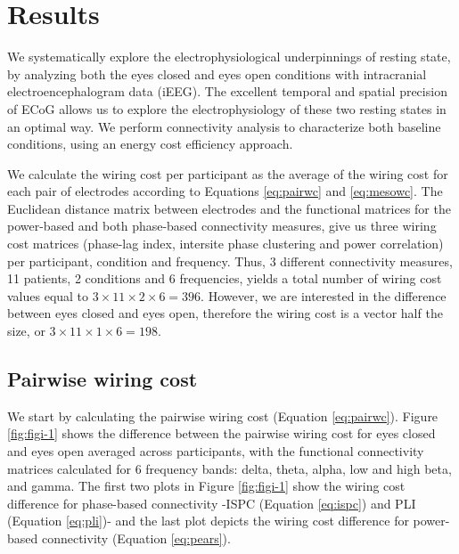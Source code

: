 \documentclass[11pt, onecolumn]{article}
\begin{document}
\section{Results}
We systematically explore the electrophysiological underpinnings of resting state, by analyzing both the eyes closed and eyes open conditions with intracranial electroencephalogram data (iEEG).
The excellent temporal and spatial precision of ECoG allows us to explore the electrophysiology of these two resting states in an optimal way. 
We perform connectivity analysis to characterize both baseline conditions, using an energy cost efficiency approach. 

We calculate the wiring cost per participant as the average of the wiring cost for each pair of electrodes according to Equations \ref{eq:pairwc} and \ref{eq:mesowc}. The Euclidean distance matrix between electrodes and the functional matrices for the power-based and both phase-based connectivity measures, give us three wiring cost matrices (phase-lag index, intersite phase clustering and power correlation) per participant, condition and frequency. Thus, 3 different connectivity measures, 11 patients, 2 conditions and 6 frequencies, yields a total number of wiring cost values equal to $3\times 11 \times 2 \times 6=396$. However, we are interested in the difference between eyes closed and eyes open, therefore  the wiring cost is a vector half the size, or $3\times 11 \times 1 \times 6=198$.

\subsection{Pairwise wiring cost}
We start by calculating the pairwise wiring cost (Equation \ref{eq:pairwc}). Figure \ref{fig:figi-1} shows the difference between the pairwise wiring cost for eyes closed and eyes open averaged across participants, with the functional connectivity matrices calculated for 6 frequency bands: delta, theta, alpha, low and high beta, and gamma. 
The first two plots in Figure \ref{fig:figi-1} show the wiring cost difference for phase-based connectivity -ISPC (Equation \ref{eq:ispc}) and PLI (Equation \ref{eq:pli})- and the last plot depicts the wiring cost difference for power-based connectivity (Equation \ref{eq:pears}).
 
\end{document}

